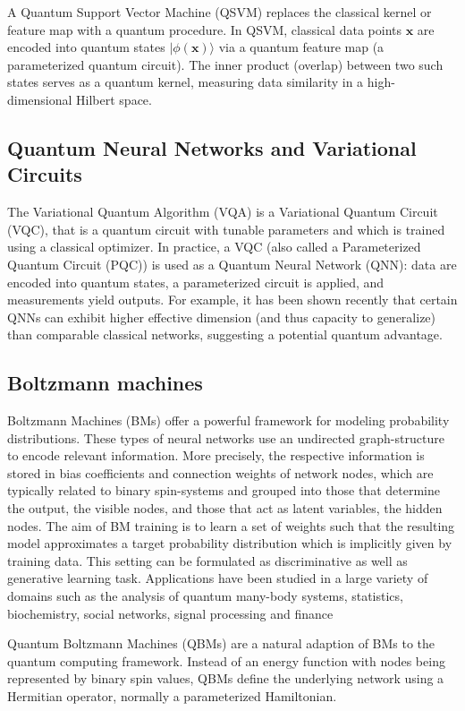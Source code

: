 \documentclass[%
oneside,                 %
final,                   %
10pt]{article}
\begin{document}
A Quantum Support Vector Machine (QSVM) replaces the classical kernel
or feature map with a quantum procedure.  In QSVM, classical data
points $\bm{x}$ are encoded into quantum states $|\phi(\bm{x})\rangle$
via a quantum feature map (a parameterized quantum circuit).  The
inner product (overlap) between two such states serves as a quantum
kernel, measuring data similarity in a high-dimensional Hilbert space.

\subsection*{Quantum Neural Networks and Variational Circuits}

The Variational Quantum Algorithm (VQA) is a Variational Quantum
Circuit (VQC), that is a quantum circuit with tunable parameters and
which is trained using a classical optimizer.  In practice, a VQC
(also called a Parameterized Quantum Circuit (PQC)) is used as a
Quantum Neural Network (QNN): data are encoded into quantum states, a
parameterized circuit is applied, and measurements yield outputs.  For
example, it has been shown recently that certain QNNs can exhibit
higher effective dimension (and thus capacity to generalize) than
comparable classical networks, suggesting a potential quantum
advantage.

\subsection*{Boltzmann machines}

Boltzmann Machines (BMs) offer a powerful framework for modeling
probability distributions.  These types of neural networks use an
undirected graph-structure to encode relevant information.  More
precisely, the respective information is stored in bias coefficients
and connection weights of network nodes, which are typically related
to binary spin-systems and grouped into those that determine the
output, the visible nodes, and those that act as latent variables, the
hidden nodes.  The aim of BM training is to learn a set of weights
such that the resulting model approximates a target probability
distribution which is implicitly given by training data.  This setting
can be formulated as discriminative as well as generative learning
task.  Applications have been studied in a large variety of domains
such as the analysis of quantum many-body systems, statistics,
biochemistry, social networks, signal processing and finance

Quantum Boltzmann Machines (QBMs) are a natural adaption of BMs to the
quantum computing framework. Instead of an energy function with nodes
being represented by binary spin values, QBMs define the underlying
network using a Hermitian operator, normally a parameterized
Hamiltonian.
\end{document}
